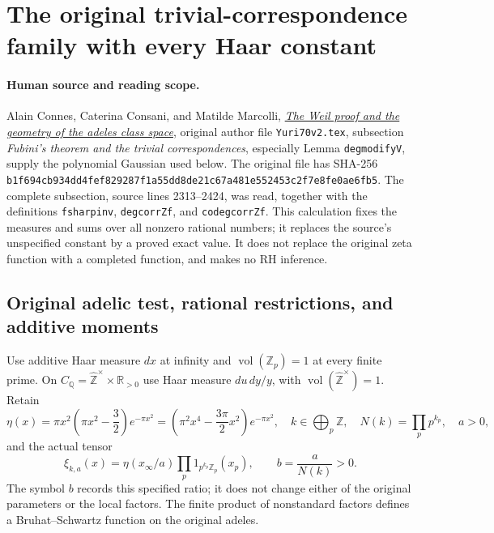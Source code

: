 \section{The original trivial-correspondence family with every Haar constant}
\label{sec:cc-exact-trivial-correspondence}

\paragraph{Human source and reading scope.}
Alain Connes, Caterina Consani, and Matilde Marcolli,
\href{https://arxiv.org/abs/math/0703392}{\emph{The Weil proof and the
geometry of the adeles class space}}, original author file
\nolinkurl{Yuri70v2.tex}, subsection \emph{Fubini's theorem and the trivial
correspondences}, especially Lemma \texttt{degmodifyV}, supply the
polynomial Gaussian used below. The original file has SHA-256
\nolinkurl{b1f694cb934dd4fef829287f1a55dd8de21c67a481e552453c2f7e8fe0ae6fb5}.
The complete subsection, source lines 2313--2424, was read, together
with the definitions \texttt{fsharpinv}, \texttt{degcorrZf}, and
\texttt{codegcorrZf}. This calculation fixes the measures and sums over
all nonzero rational numbers; it replaces the source's unspecified
constant by a proved exact value. It does not replace the original
zeta function with a completed function, and makes no RH inference.

\subsection{Original adelic test, rational restrictions, and additive moments}

Use additive Haar measure $dx$ at infinity and
$\operatorname{vol}(\mathbb Z_p)=1$ at every finite prime. On
$C_{\mathbb Q}=\widehat{\mathbb Z}^{\times}\times\mathbb R_{>0}$
use Haar measure $du\,dy/y$, with
$\operatorname{vol}(\widehat{\mathbb Z}^{\times})=1$. Retain
\begin{equation}\tag{ETC1}
 \eta(x)=\pi x^2\left(\pi x^2-\frac32\right)e^{-\pi x^2}
        =\left(\pi^2x^4-\frac{3\pi}{2}x^2\right)e^{-\pi x^2},
 \quad k\in\bigoplus_p\mathbb Z,
 \quad N(k)=\prod_pp^{k_p},\quad a>0,
\end{equation}
and the actual tensor
\begin{equation}\tag{ETC2}
 \xi_{k,a}(x)=\eta(x_\infty/a)
                  \prod_p1_{p^{k_p}\mathbb Z_p}(x_p),
 \qquad b=\frac a{N(k)}>0.
\end{equation}
The symbol $b$ records this specified ratio; it does not change either
of the original parameters or the local factors. The finite product
of nonstandard factors defines a Bruhat--Schwartz function on the
original adeles.

